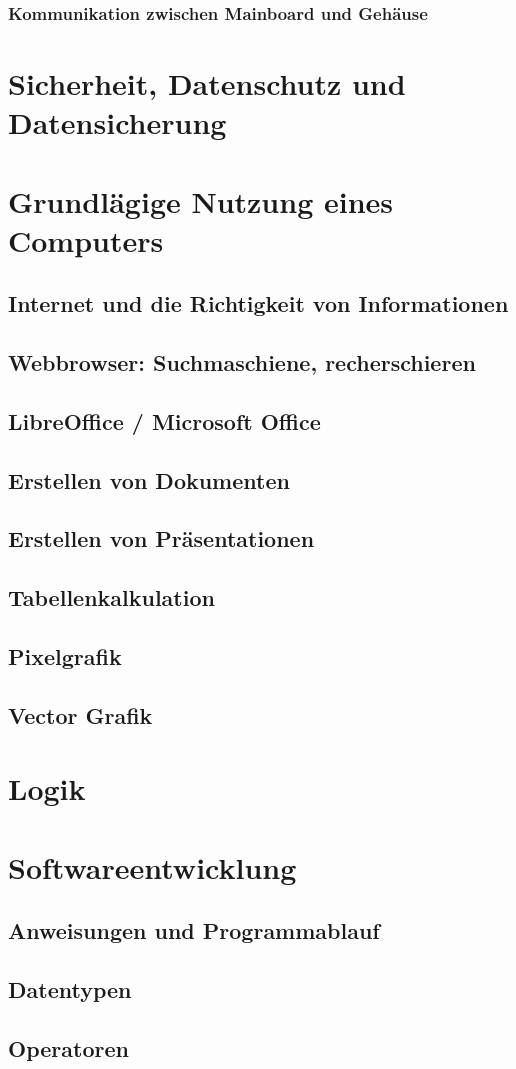 \documentclass[12pt]{article}
\begin{document}
\subsubsection{Kommunikation zwischen Mainboard und Gehäuse}

\section{Sicherheit, Datenschutz und Datensicherung}

\section{Grundlägige Nutzung eines Computers}
\subsection{Internet und die Richtigkeit von Informationen }
\subsection{Webbrowser: Suchmaschiene, recherschieren}
\subsection{LibreOffice / Microsoft Office}
\subsection{Erstellen von Dokumenten}
\subsection{Erstellen von Präsentationen}
\subsection{Tabellenkalkulation}
\subsection{Pixelgrafik}
\subsection{Vector Grafik}

\section{Logik}

\section{Softwareentwicklung}
\subsection{Anweisungen und Programmablauf}
\subsection{Datentypen}
\subsection{Operatoren}
\end{document}
